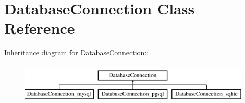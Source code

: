 \hypertarget{classDatabaseConnection}{
\section{DatabaseConnection Class Reference}
\label{classDatabaseConnection}
}
Inheritance diagram for DatabaseConnection::\begin{figure}[H]
\begin{center}
\leavevmode
\includegraphics[height=2cm]{classDatabaseConnection}
\end{center}
\end{figure}
